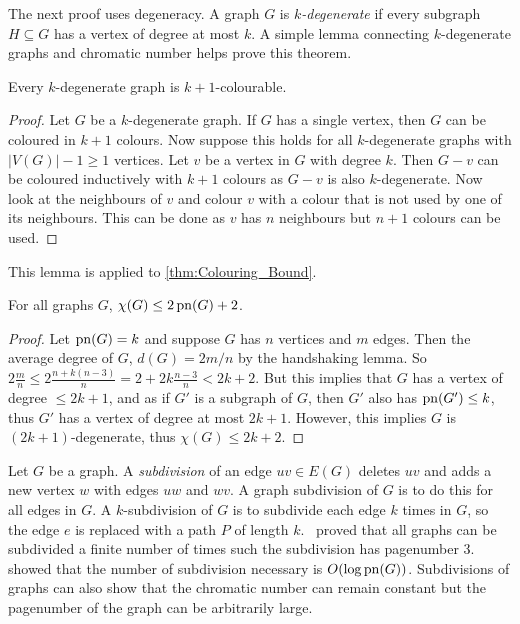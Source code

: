 The next proof uses degeneracy. A graph $G$ is \textit{$k$-degenerate} if every subgraph $H \subseteq G$ has a vertex of degree at most $k$. 
A simple lemma connecting $k$-degenerate graphs and chromatic number helps prove this theorem. 
\begin{lemma}
	Every $k$-degenerate graph is $k + 1$-colourable.
\end{lemma}
\begin{proof}
	Let $G$ be a $k$-degenerate graph. If $G$ has a single vertex, then $G$ can be coloured in $k + 1$ colours. Now suppose this holds for all $k$-degenerate graphs with $|V(G)|- 1 \geq 1$ vertices. Let $v$ be a vertex in $G$ with degree $k$. Then $G - v$ can be coloured inductively with $k + 1$ colours as $G - v$ is also $k$-degenerate. Now look at the neighbours of $v$ and colour $v$ with a colour that is not used by one of its neighbours. This can be done as $v$ has $n$ neighbours but $n + 1$ colours can be used. 
\end{proof}

This lemma is applied to \cref{thm:Colouring_Bound}.

\begin{proposition}\label{thm:Colouring_Bound}
	For all graphs \(G\), \(\chi(G) \leq 2 \operatorname{pn}(G) + 2\).
\end{proposition}
\begin{proof}
	Let \(\operatorname{pn}(G) = k\) and suppose \(G\) has \(n\) vertices and \(m\) edges. Then the average degree of \(G\), \(d(G) = 2m/n\) by the handshaking lemma. So \(2\frac{m}{n} \leq 2 \frac{n + k(n-3)}{n} = 2 + 2k \frac{n-3}{n} < 2k + 2\). But this implies that \(G\) has a vertex of degree \(\leq 2k + 1\), and as if \(G'\) is a subgraph of \(G\), then \(G'\) also has \(\operatorname{pn}(G') \leq k\), thus \(G'\) has a vertex of degree at most \(2k + 1\). However, this implies \(G\) is \((2k + 1)\)-degenerate, thus \(\chi(G) \leq 2k + 2\).
\end{proof}

Let $G$ be a graph. A \textit{subdivision} of an edge $uv \in E(G)$ deletes $uv$ and adds a new vertex $w$ with edges $uw$ and $wv$. A graph subdivision of $G$ is to do this for all edges in $G$. A $k$-subdivision of $G$ is to subdivide each edge $k$ times in $G$, so the edge $e$ is replaced with a path $P$ of length $k$.\ \textcite{atneosenEmbeddabilityCompactaNbooks} proved that all graphs can be subdivided a finite number of times such the subdivision has pagenumber 3.\ \textcite{dujmovicLayoutsGraphSubdivisions2005} showed that the number of subdivision necessary is $O(\log\operatorname{pn}(G))$. Subdivisions of graphs can also show that the chromatic number can remain constant but the pagenumber of the graph can be arbitrarily large.

